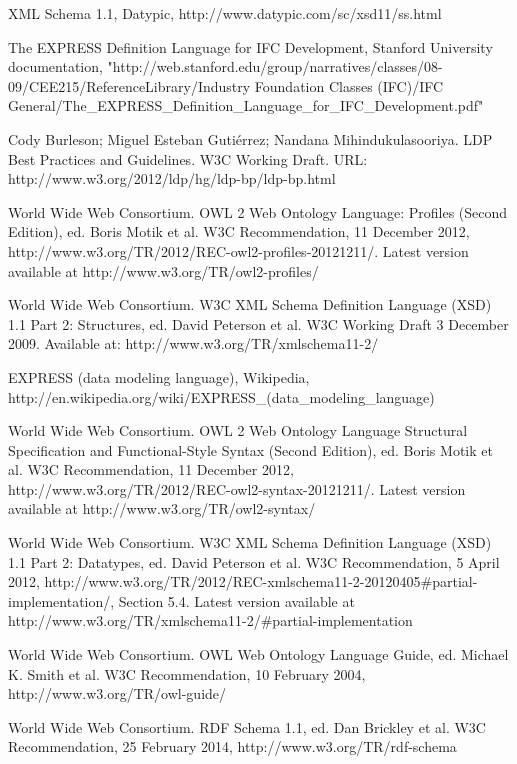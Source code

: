 %
%


\begin{thebibliography}{}

XML Schema 1.1, Datypic, http://www.datypic.com/sc/xsd11/ss.html

The EXPRESS Definition Language for IFC Development, Stanford University documentation,
"http://web.stanford.edu/group/narratives/classes/08-09/CEE215/ReferenceLibrary/Industry Foundation Classes (IFC)/IFC General/The\_EXPRESS\_Definition\_Language\_for\_IFC\_Development.pdf"

Cody Burleson; Miguel Esteban Gutiérrez; Nandana Mihindukulasooriya. LDP Best Practices and Guidelines. W3C Working Draft. URL: http://www.w3.org/2012/ldp/hg/ldp-bp/ldp-bp.html

World Wide Web Consortium. OWL 2 Web Ontology Language: Profiles (Second Edition), ed. Boris Motik et al. W3C Recommendation, 11 December 2012, http://www.w3.org/TR/2012/REC-owl2-profiles-20121211/. Latest version available at http://www.w3.org/TR/owl2-profiles/

World Wide Web Consortium. W3C XML Schema Definition Language (XSD) 1.1 Part 2: Structures, ed. David Peterson et al. W3C Working Draft 3 December 2009. Available at: http://www.w3.org/TR/xmlschema11-2/

EXPRESS (data modeling language), Wikipedia, http://en.wikipedia.org/wiki/EXPRESS\_(data\_modeling\_language)

World Wide Web Consortium. OWL 2 Web Ontology Language 
Structural Specification and Functional-Style Syntax (Second Edition), ed. Boris Motik et al. W3C Recommendation, 11 December 2012, http://www.w3.org/TR/2012/REC-owl2-syntax-20121211/. Latest version available at http://www.w3.org/TR/owl2-syntax/

World Wide Web Consortium. W3C XML Schema Definition Language (XSD) 1.1 Part 2: Datatypes, ed. David Peterson et al. W3C Recommendation, 5 April 2012, http://www.w3.org/TR/2012/REC-xmlschema11-2-20120405#partial-implementation/, Section 5.4. Latest version available at http://www.w3.org/TR/xmlschema11-2/#partial-implementation

World Wide Web Consortium. OWL Web Ontology Language Guide, ed. Michael K. Smith et al. W3C Recommendation, 10 February 2004, http://www.w3.org/TR/owl-guide/

World Wide Web Consortium. RDF Schema 1.1, ed. Dan Brickley et al. W3C Recommendation, 25 February 2014, http://www.w3.org/TR/rdf-schema

\end{thebibliography}
